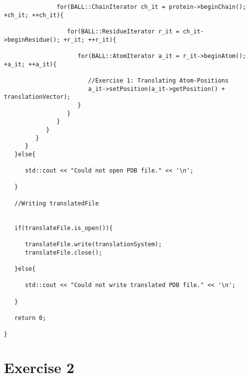 \documentclass[11pt]{article}
\begin{document}
\begin{lstlisting}
               for(BALL::ChainIterator ch_it = protein->beginChain(); +ch_it; ++ch_it){

                  for(BALL::ResidueIterator r_it = ch_it->beginResidue(); +r_it; ++r_it){

                     for(BALL::AtomIterator a_it = r_it->beginAtom(); +a_it; ++a_it){

                        //Exercise 1: Translating Atom-Positions
                        a_it->setPosition(a_it->getPosition() + translationVector);
                     }                   
                  }
               }
            }
         }
      }
   }else{

      std::cout << "Could not open PDB file." << '\n';

   }

   //Writing translatedFile


   if(translateFile.is_open()){

      translateFile.write(translationSystem);
      translateFile.close();

   }else{

      std::cout << "Could not write translated PDB file." << '\n';

   }

   return 0;

}

\end{lstlisting}

\section{Exercise 2}
\end{document}
